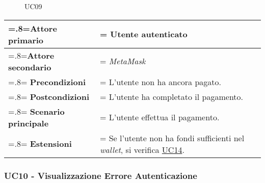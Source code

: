            \begin{figure}[H]
                \centering
                
                \caption{UC09}
            \end{figure}

            \begin{center}
                \renewcommand{\arraystretch}{1.5}
                \renewcommand\tabularxcolumn[1]{m{#1}}
                \begin{tabularx}{0.9\textwidth} {
                    >{\hsize=.8\hsize\linewidth=\hsize}X
                    >{\hsize=1.2\hsize\linewidth=\hsize}X}
                    \hline
                    \textbf{Attore primario} & Utente autenticato \\
                    \hline
                    \textbf{Attore secondario} & \textit{MetaMask} \\
                    \hline
                    \textbf{Precondizioni} & L'utente non ha ancora pagato. \\
                    \hline
                    \textbf{Postcondizioni} & L'utente ha completato il pagamento. \\
                    \hline
                    \textbf{Scenario principale} & L'utente effettua il pagamento. \\
                    \hline
                    \textbf{Estensioni} & Se l'utente non ha fondi sufficienti nel \textit{wallet}, si verifica \hyperref[UC14]{UC14}.\\
                    \hline
                \end{tabularx}
            \end{center}

        \subsubsection{UC10 - Visualizzazione Errore Autenticazione}
        \label{UC10}

